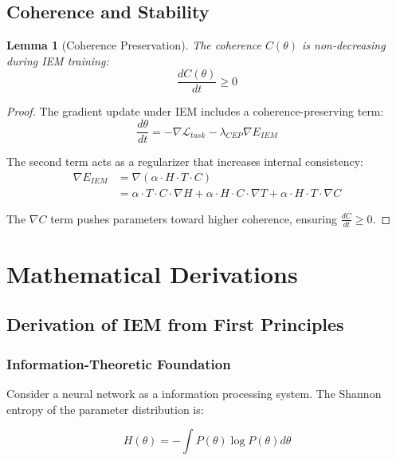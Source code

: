 \documentclass[12pt]{article}
\newtheorem{lemma}[theorem]{Lemma}
\begin{document}
\subsection{Coherence and Stability}

\begin{lemma}[Coherence Preservation]
The coherence $C(\theta)$ is non-decreasing during IEM training:
\begin{equation}
\frac{dC(\theta)}{dt} \geq 0
\end{equation}
\end{lemma}

\begin{proof}
The gradient update under IEM includes a coherence-preserving term:
\begin{equation}
\frac{d\theta}{dt} = -\nabla \mathcal{L}_{task} - \lambda_{CEP} \nabla E_{IEM}
\end{equation}

The second term acts as a regularizer that increases internal consistency:
\begin{align}
\nabla E_{IEM} &= \nabla(\alpha \cdot H \cdot T \cdot C) \\
&= \alpha \cdot T \cdot C \cdot \nabla H + \alpha \cdot H \cdot C \cdot \nabla T + \alpha \cdot H \cdot T \cdot \nabla C
\end{align}

The $\nabla C$ term pushes parameters toward higher coherence, ensuring $\frac{dC}{dt} \geq 0$.
\end{proof}

\section{Mathematical Derivations}

\subsection{Derivation of IEM from First Principles}

\subsubsection{Information-Theoretic Foundation}

Consider a neural network as a information processing system. The Shannon entropy of the parameter distribution is:

\begin{equation}
H(\theta) = -\int P(\theta) \log P(\theta) d\theta
\end{equation}
\end{document}
